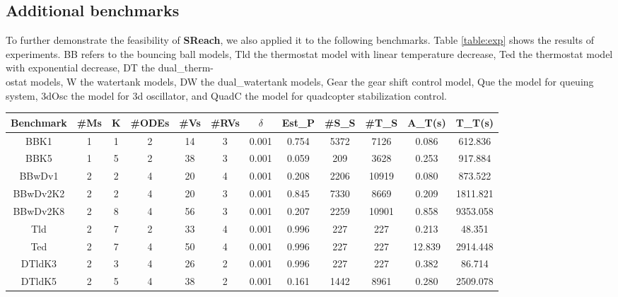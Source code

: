 \subsection{Additional benchmarks}
To further demonstrate the feasibility of {\bf SReach}, we also applied it to the following benchmarks. Table \ref{table:exp} shows the results of experiments. BB refers to the bouncing ball models, Tld the thermostat model with linear temperature decrease, Ted the thermostat model with exponential decrease, DT the dual\_therm-\\ostat models, W the watertank models, DW the dual\_watertank models, Gear the gear shift control model, Que the model for queuing system, 3dOsc the model for 3d oscillator, and QuadC the model for quadcopter stabilization control. 
\begin{table}[h]
\centering
    \begin{tabular}{c|c|c|c|c|c|c|c|c|c|c|c}
    \hline
    Benchmark & \#Ms & K & \#ODEs & \#Vs & \#RVs & $\delta$ & Est\_P & \#S\_S & \#T\_S &  A\_T(s) & T\_T(s)  \\ \hline
    BBK1      & 1       & 1 & 2      & 14    & 3     & 0.001 & 0.754  & 5372      & 7126     & 0.086  & 612.836         \\ \hline
    BBK5      & 1       & 5 & 2      & 38    & 3     & 0.001 & 0.059  & 209       & 3628     & 0.253   &  917.884       \\ \hline
    BBwDv1    & 2       & 2 & 4      & 20    & 4     & 0.001 & 0.208  & 2206      & 10919    & 0.080   &  873.522     \\ \hline
    BBwDv2K2  & 2       & 2 & 4      & 20    & 3     & 0.001 & 0.845  & 7330      & 8669     & 0.209    & 1811.821      \\ \hline
    BBwDv2K8  & 2       & 8 & 4      & 56    & 3     & 0.001 & 0.207  & 2259      & 10901    & 0.858  & 9353.058        \\ \hline
    Tld       & 2       & 7 & 2      & 33     & 4     & 0.001 & 0.996      & 227         & 227        & 0.213     & 48.351         \\ \hline
    Ted       & 2       & 7 & 4      & 50     & 4     & 0.001 & 0.996      & 227         & 227       & 12.839   & 2914.448     \\ \hline
    DTldK3    & 2       & 3 & 4      & 26    & 2     & 0.001 & 0.996  & 227       & 227      & 0.382    & 86.714      \\ \hline
    DTldK5    & 2       & 5 & 4      & 38    & 2     & 0.001 & 0.161  & 1442      & 8961     & 0.280  &  2509.078       \\ \hline

\end{tabular}
\end{table}
